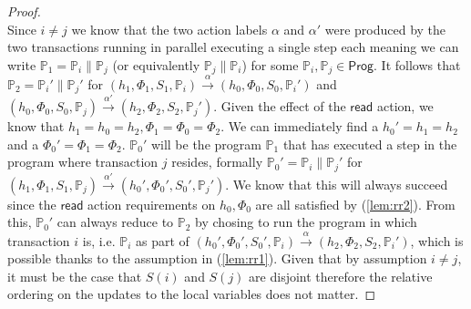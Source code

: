 \begin{proof}
\[\]
Since $i \neq j$ we know that the two action labels $\alpha$ and $\alpha'$ were produced by the two transactions running in parallel executing a single step each meaning we can write $\mathds{P}_1 = \mathds{P}_i \| \mathds{P}_j$ (or equivalently $\mathds{P}_j \| \mathds{P}_i$) for some $\mathds{P}_i, \mathds{P}_j \in \mathsf{Prog}$. It follows that $\mathds{P}_2 = \mathds{P}_i' \| \mathds{P}_j'$ for $(h_1, \Phi_1, S_1, \mathds{P}_i) \xrightarrow{\alpha} (h_0, \Phi_0, S_0, \mathds{P}_i')$ and $(h_0, \Phi_0, S_0, \mathds{P}_j) \xrightarrow{\alpha'} (h_2, \Phi_2, S_2, \mathds{P}_j')$. Given the effect of the $\mathsf{read}$ action, we know that $h_1 = h_0 = h_2, \Phi_1 = \Phi_0 = \Phi_2$. We can immediately find a $h_0' = h_1 = h_2$ and a $\Phi_0' = \Phi_1 = \Phi_2$. $\mathds{P}_0'$ will be the program $\mathds{P}_1$ that has executed a step in the program where transaction $j$ resides, formally $\mathds{P}_0' = \mathds{P}_i \| \mathds{P}_j'$ for $(h_1, \Phi_1, S_1, \mathds{P}_j) \xrightarrow{\alpha'} (h_0', \Phi_0', S_0', \mathds{P}_j')$. We know that this will always succeed since the $\mathsf{read}$ action requirements on $h_0, \Phi_0$ are all satisfied by (\ref{lem:rr2}). From this, $\mathds{P}_0'$ can always reduce to $\mathds{P}_2$ by chosing to run the program in which transaction $i$ is, i.e. $\mathds{P}_i$ as part of $(h_0', \Phi_0', S_0', \mathds{P}_i) \xrightarrow{\alpha} (h_2, \Phi_2, S_2, \mathds{P}_i')$, which is possible thanks to the assumption in (\ref{lem:rr1}). Given that by assumption $i \neq j$, it must be the case that $S(i)$ and $S(j)$ are disjoint therefore the relative ordering on the updates to the local variables does not matter.
\end{proof}

